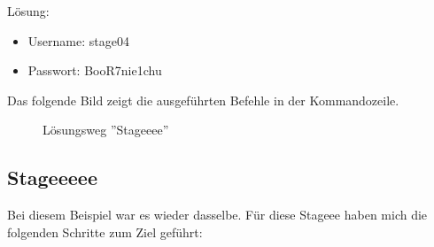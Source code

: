 \documentclass[12pt, a4paper, titlepage, oneside]{scrartcl}
\begin{document}
	Lösung:
	\begin{itemize}
		\item Username: stage04

		\item Passwort: BooR7nie1chu
	\end{itemize}

	Das folgende Bild zeigt die ausgeführten Befehle in der Kommandozeile.
	\begin{figure}[h!]
		\centering
		\caption{Lösungsweg ''Stageeee''}
		\label{fig:stageeee_solution}
	\end{figure}

	\subsection{Stageeeee}
	Bei diesem Beispiel war es wieder dasselbe. Für diese Stageee haben mich die
	folgenden Schritte zum Ziel geführt:
\end{document}
